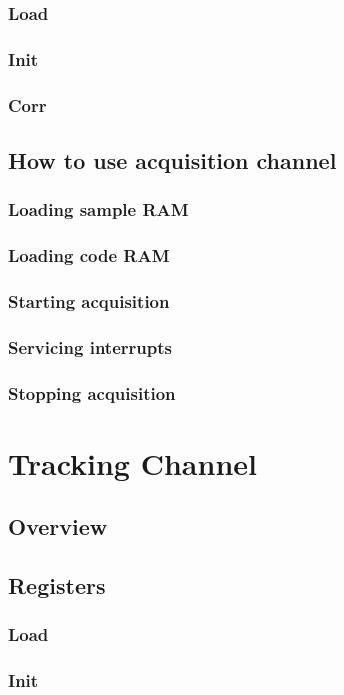 \documentclass{article}
\begin{document}
\begin{multicols}{2}
\subsubsection{Load}
\subsubsection{Init}
\subsubsection{Corr}
\subsection{How to use acquisition channel}
\subsubsection{Loading sample RAM}
\subsubsection{Loading code RAM}
\subsubsection{Starting acquisition}
\subsubsection{Servicing interrupts}
\subsubsection{Stopping acquisition}

\section{Tracking Channel}
\subsection{Overview}
\subsection{Registers}
\subsubsection{Load}
\subsubsection{Init}

\end{multicols}
\end{document}

